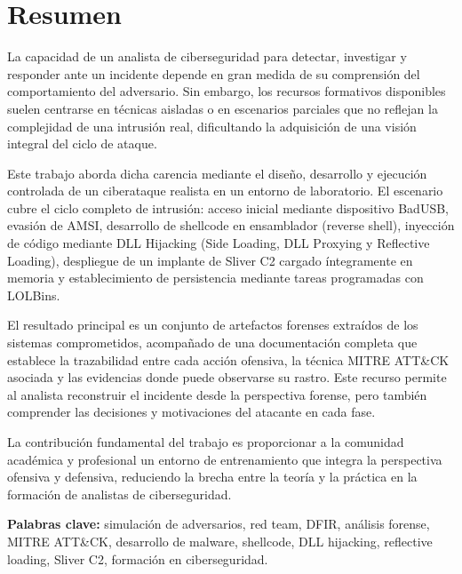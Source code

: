 
\chapter*{Resumen}

La capacidad de un analista de ciberseguridad para detectar, investigar y responder ante un incidente depende en gran medida de su comprensión del comportamiento del adversario. Sin embargo, los recursos formativos disponibles suelen centrarse en técnicas aisladas o en escenarios parciales que no reflejan la complejidad de una intrusión real, dificultando la adquisición de una visión integral del ciclo de ataque.

Este trabajo aborda dicha carencia mediante el diseño, desarrollo y ejecución controlada de un ciberataque realista en un entorno de laboratorio. El escenario cubre el ciclo completo de intrusión: acceso inicial mediante dispositivo BadUSB, evasión de AMSI, desarrollo de shellcode en ensamblador (reverse shell), inyección de código mediante DLL Hijacking (Side Loading, DLL Proxying y Reflective Loading), despliegue de un implante de Sliver C2 cargado íntegramente en memoria y establecimiento de persistencia mediante tareas programadas con LOLBins.

El resultado principal es un conjunto de artefactos forenses extraídos de los sistemas comprometidos, acompañado de una documentación completa que establece la trazabilidad entre cada acción ofensiva, la técnica MITRE ATT\&CK asociada y las evidencias donde puede observarse su rastro. Este recurso permite al analista reconstruir el incidente desde la perspectiva forense, pero también comprender las decisiones y motivaciones del atacante en cada fase.

La contribución fundamental del trabajo es proporcionar a la comunidad académica y profesional un entorno de entrenamiento que integra la perspectiva ofensiva y defensiva, reduciendo la brecha entre la teoría y la práctica en la formación de analistas de ciberseguridad.

\textbf{Palabras clave:} simulación de adversarios, red team, DFIR, análisis forense, MITRE ATT\&CK, desarrollo de malware, shellcode, DLL hijacking, reflective loading, Sliver C2, formación en ciberseguridad.